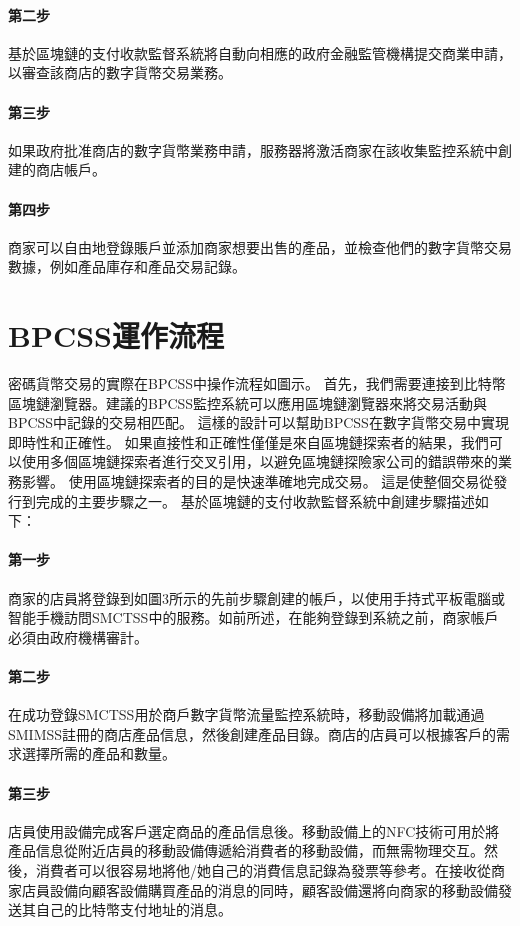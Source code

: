 		\paragraph{第二步}基於區塊鏈的支付收款監督系統將自動向相應的政府金融監管機構提交商業申請，以審查該商店的數字貨幣交易業務。
		\paragraph{第三步}如果政府批准商店的數字貨幣業務申請，服務器將激活商家在該收集監控系統中創建的商店帳戶。
		\paragraph{第四步}商家可以自由地登錄賬戶並添加商家想要出售的產品，並檢查他們的數字貨幣交易數據，例如產品庫存和產品交易記錄。

	\section{BPCSS運作流程}
	密碼貨幣交易的實際在BPCSS中操作流程如圖示。 首先，我們需要連接到比特幣區塊鏈瀏覽器。建議的BPCSS監控系統可以應用區塊鏈瀏覽器來將交易活動與BPCSS中記錄的交易相匹配。 這樣的設計可以幫助BPCSS在數字貨幣交易中實現即時性和正確性。 如果直接性和正確性僅僅是來自區塊鏈探索者的結果，我們可以使用多個區塊鏈探索者進行交叉引用，以避免區塊鏈探險家公司的錯誤帶來的業務影響。 使用區塊鏈探索者的目的是快速準確地完成交易。 這是使整個交易從發行到完成的主要步驟之一。
	基於區塊鏈的支付收款監督系統中創建步驟描述如下：
		\paragraph{第一步}商家的店員將登錄到如圖3所示的先前步驟創建的帳戶，以使用手持式平板電腦或智能手機訪問SMCTSS中的服務。如前所述，在能夠登錄到系統之前，商家帳戶必須由政府機構審計。
		\paragraph{第二步}在成功登錄SMCTSS用於商戶數字貨幣流量監控系統時，移動設備將加載通過SMIMSS註冊的商店產品信息，然後創建產品目錄。商店的店員可以根據客戶的需求選擇所需的產品和數量。
		\paragraph{第三步}店員使用設備完成客戶選定商品的產品信息後。移動設備上的NFC技術可用於將產品信息從附近店員的移動設備傳遞給消費者的移動設備，而無需物理交互。然後，消費者可以很容易地將他/她自己的消費信息記錄為發票等參考。在接收從商家店員設備向顧客設備購買產品的消息的同時，顧客設備還將向商家的移動設備發送其自己的比特幣支付地址的消息。
